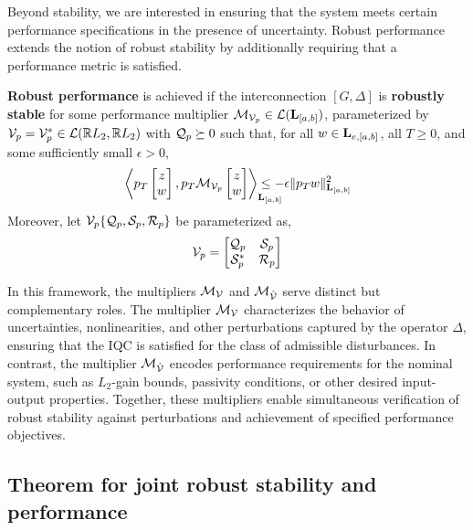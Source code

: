 Beyond stability, we are interested in ensuring that the system meets certain performance specifications in the presence of uncertainty. Robust performance extends the notion of robust stability by additionally requiring that a performance metric is satisfied.
\begin{definition}\label{def:robperf}
	\textbf{Robust performance} is achieved if the interconnection $[G,\Delta]$ is \textbf{robustly stable} for some performance multiplier $\mathcal{M}_{{\mathcal{V}_p}}\in\mathcal{L}(\mathbf{L}_{[a, b]})$, parameterized by ${\mathcal{V}}_p = {\mathcal{V}}^*_p\in \mathcal{L}(\mathbb{R} L_2, \mathbb{R} L_2)$  with ${\mathcal{Q}}_{p}\succeq 0$ such that, for all $w \in\mathbf{L}_{e, [a, b]}$,  all $T \geq 0$, and some sufficiently small $\epsilon >0$,
	\begin{equation*}\ip{p_T\bmat{z \\ w}}{p_T\mcl{M}_{{\mcl{V}}_p}\bmat{z \\ w}}_{\mbf L_{[a, b]}} \!\!\!\!\!\!\!\!\!\!\!\!\leq -\epsilon \|p_Tw\|_{\mbf L_{[a, b]}}^2
	\end{equation*}
	Moreover, let ${\mathcal{V}}_p\{{\mathcal{Q}}_p, {\mathcal{S}}_p, {\mathcal{R}}_p\}$ be parameterized as,
	\begin{equation*}
		{\mathcal{V}}_p = \begin{bmatrix}{\mathcal{Q}}_p &  {\mathcal{S}}_p\\ {\mathcal{S}}_p^* & {\mathcal{R}}_p\end{bmatrix}
	\end{equation*}
\end{definition}
In this framework, the multipliers $\mathcal{M}_{\mathcal{V}}$ and $\mathcal{M}_{\hat{\mathcal{V}}}$ serve distinct but complementary roles. The multiplier $\mathcal{M}_{\mathcal{V}}$ characterizes the behavior of uncertainties, nonlinearities, and other perturbations captured by the operator $\Delta$, ensuring that the IQC is satisfied for the class of admissible disturbances. In contrast, the multiplier $\mathcal{M}_{\hat{\mathcal{V}}}$ encodes performance requirements for the nominal system, such as $L_2$-gain bounds, passivity conditions, or other desired input-output properties. Together, these multipliers enable simultaneous verification of robust stability against perturbations and achievement of specified performance objectives.

\subsection{Theorem for joint robust stability and performance}

